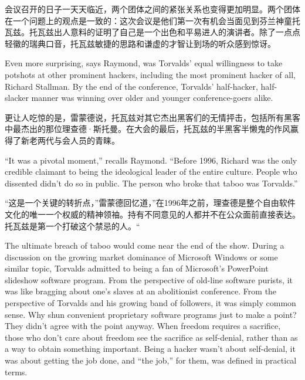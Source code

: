 \ifdefined\chs
会议召开的日子一天天临近，两个团体之间的紧张关系也变得更加明显。两个团体在一个问题上的观点是一致的：这次会议是他们第一次有机会当面见到芬兰神童托瓦兹。托瓦兹出人意料的证明了自己是一个出色和平易进人的演讲者。除了一点点轻徽的瑞典口音，托瓦兹敏捷的思路和谦虚的才智让到场的听众感到惊讶。 
\fi

\ifdefined\eng
Even more surprising, says Raymond, was Torvalds' equal willingness to take potshots at other prominent hackers, including the most prominent hacker of all, Richard Stallman. By the end of the conference, Torvalds' half-hacker, half-slacker manner was winning over older and younger conference-goers alike.
\fi

\ifdefined\chs
更让人吃惊的是，雷蒙德说，托瓦兹对其它杰出黑客们的无情抨击，包括所有黑客中最杰出的那位理查德·斯托曼。在大会的最后，托瓦兹的半黑客半懒鬼的作风赢得了新老两代与会人员的青睐。
\fi

\ifdefined\eng
``It was a pivotal moment,'' recalls Raymond. ``Before 1996, Richard was the only credible claimant to being the ideological leader of the entire culture. People who dissented didn't do so in public. The person who broke that taboo was Torvalds.''
\fi

\ifdefined\chs
``这是一个关键的转折点，''雷蒙德回忆道，''在1996年之前，理查德是整个自由软件文化的唯一一个权威的精神领袖。持有不同意见的人都并不在公众面前直接表达。托瓦兹是第一个打破这个禁忌的人。``
\fi

\ifdefined\eng
The ultimate breach of taboo would come near the end of the show. During a discussion on the growing market dominance of Microsoft Windows or some similar topic, Torvalds admitted to being a fan of Microsoft's PowerPoint slideshow software program. From the perspective of old-line software purists, it was like bragging about one's slaves at an abolitionist conference. From the perspective of Torvalds and his growing band of followers, it was simply common sense. Why shun convenient proprietary software programs just to make a point? They didn't agree with the point anyway. When freedom requires a sacrifice, those who don't care about freedom see the sacrifice as self-denial, rather than as a way to obtain something important.  Being a hacker wasn't about self-denial, it was about getting the job done, and ``the job,'' for them, was defined in practical terms.
\fi

